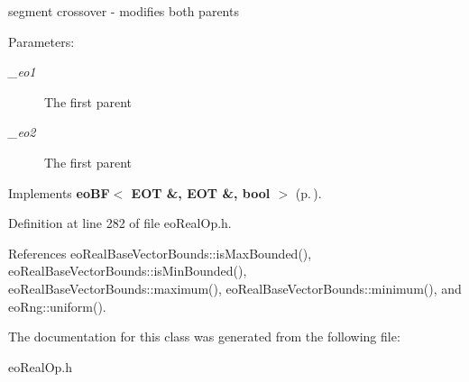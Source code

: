 segment crossover - modifies both parents 

\begin{Desc}
\item[Parameters:]
\begin{description}
\item[{\em \_\-eo1}]The first parent \item[{\em \_\-eo2}]The first parent \end{description}
\end{Desc}


Implements {\bf eo\-BF$<$ EOT \&, EOT \&, bool $>$} {\rm (p.\,\pageref{classeo_b_f_a1})}.

Definition at line 282 of file eo\-Real\-Op.h.

References eo\-Real\-Base\-Vector\-Bounds::is\-Max\-Bounded(), eo\-Real\-Base\-Vector\-Bounds::is\-Min\-Bounded(), eo\-Real\-Base\-Vector\-Bounds::maximum(), eo\-Real\-Base\-Vector\-Bounds::minimum(), and eo\-Rng::uniform().

The documentation for this class was generated from the following file:\begin{CompactItemize}
\item 
eo\-Real\-Op.h\end{CompactItemize}
